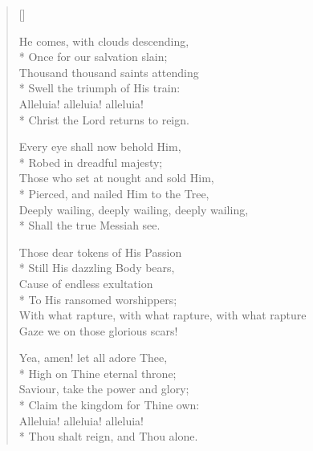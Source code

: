\newHymn




\begin{verse}[\versewidth]

 He comes, with clouds descending,\\*
Once for our salvation slain;\\
Thousand thousand saints attending\\*
Swell the triumph of His train:\\
Alleluia! alleluia! alleluia!\\*
Christ the Lord returns to reign.

Every eye shall now behold Him,\\*
Robed in dreadful majesty;\\
Those who set at nought and sold Him,\\*
Pierced, and nailed Him to the Tree,\\
Deeply wailing, deeply wailing, deeply wailing,\\*
Shall the true Messiah see.

Those dear tokens of His Passion\\*
Still His dazzling Body bears,\\
Cause of endless exultation\\*
To His ransomed worshippers;\\
With what rapture, with what rapture, with what rapture\\
Gaze we on those glorious scars!


Yea, amen! let all adore Thee,\\*
High on Thine eternal throne;\\
Saviour, take the power and glory;\\*
Claim the kingdom for Thine own:\\
Alleluia! alleluia! alleluia!\\*
Thou shalt reign, and Thou alone.

\end{verse}

